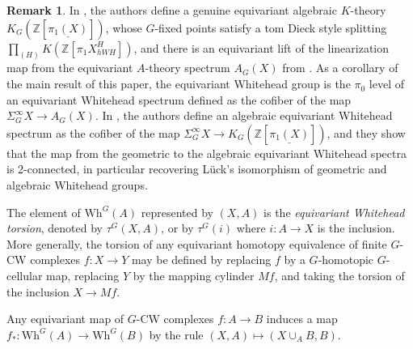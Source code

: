 \documentclass[11pt]{amsart}
\theoremstyle{definition}
\newtheorem{rem}{Remark}[section]
\numberwithin{equation}{section}
\numberwithin{figure}{section}
\newcommand{\Z}{\mathbb Z}
\newcommand{\Wh}{\mathrm{Wh}}
\begin{document}
\begin{rem}In \cite{ccm}, the authors define a genuine equivariant algebraic $K$-theory $K_G(\Z[\underline{\pi_1(X)}])$, whose $G$-fixed points satisfy a tom Dieck style splitting $\prod_{(H)} K(\Z[\pi_1 X^H_{hWH} ])$, and there is an equivariant lift of the linearization map from the equivariant $A$-theory spectrum $A_G(X)$ from \cite{CaryMona}. As a corollary of the main result of this paper, the equivariant Whitehead group is the $\pi_0$ level of an equivariant Whitehead spectrum defined as the cofiber of the map $\Sigma_G^\infty X\to A_G(X)$. In \cite{ccm},  the authors define an algebraic equivariant Whitehead spectrum as the cofiber of the map $\Sigma_G^\infty X\to K_G(\Z[\underline{\pi_1(X)}])$, and they show that the map from the geometric to the algebraic equivariant Whitehead spectra is 2-connected, in particular recovering L\" uck's isomorphism of geometric and algebraic Whitehead groups.
\end{rem}


	
	The element of $\Wh^G(A)$ represented by $(X,A)$ is the \emph{equivariant Whitehead torsion}, denoted by $\tau^G(X,A)$, or by $\tau^G(i)$ where $i:A\to X$ is the inclusion. More generally, the torsion of any equivariant homotopy equivalence of finite $G$-CW complexes $f: X\to Y$ may be defined by replacing $f$ by a $G$-homotopic $G$-cellular map, replacing $Y$ by the mapping cylinder $Mf$, and taking the torsion of the inclusion $X \to Mf$.
	
	Any equivariant map of $G$-CW complexes $f\colon A \to B$ induces a map $f_*\colon \Wh^G(A) \to \Wh^G(B)$ by the rule $(X,A)\mapsto (X \cup_A B,B)$. 
			 
\end{document}
